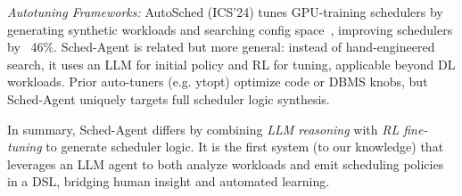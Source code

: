 \emph{Autotuning Frameworks:} AutoSched (ICS'24) tunes GPU-training schedulers by generating synthetic workloads and searching config space~\cite{tianweiz07,tianweiz07b}, improving schedulers by ~46\%. Sched-Agent is related but more general: instead of hand-engineered search, it uses an LLM for initial policy and RL for tuning, applicable beyond DL workloads. Prior auto-tuners (e.g. ytopt) optimize code or DBMS knobs, but Sched-Agent uniquely targets full scheduler logic synthesis.

In summary, Sched-Agent differs by combining \emph{LLM reasoning} with \emph{RL fine-tuning} to generate scheduler logic. It is the first system (to our knowledge) that leverages an LLM agent to both analyze workloads and emit scheduling policies in a DSL, bridging human insight and automated learning.